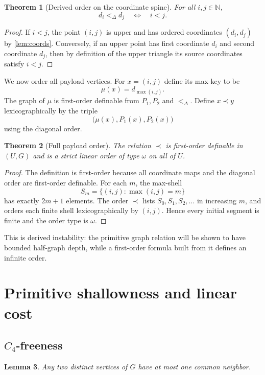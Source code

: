 \documentclass[11pt]{article}
\newtheorem{theorem}{Theorem}[section]
\newtheorem{lemma}[theorem]{Lemma}
\theoremstyle{definition}
\newcommand{\N}{\mathbb N}
\begin{document}
\begin{theorem}[Derived order on the coordinate spine]\label{thm:diagorder}
For all $i,j\in\N$,
\[
d_i<_{\Delta}d_j\quad\Longleftrightarrow\quad i<j.
\]
\end{theorem}

\begin{proof}
If $i<j$, the point $(i,j)$ is upper and has ordered coordinates $(d_i,d_j)$ by \cref{lem:coords}.  Conversely, if an upper point has first coordinate $d_i$ and second coordinate $d_j$, then by definition of the upper triangle its source coordinates satisfy $i<j$.
\end{proof}

We now order all payload vertices.  For $x=(i,j)$ define its max-key to be
\[
\mu(x)=d_{\max(i,j)}.
\]
The graph of $\mu$ is first-order definable from $P_1,P_2$ and $<_{\Delta}$.  Define $x\prec y$ lexicographically by the triple
\[
\bigl(\mu(x),P_1(x),P_2(x)\bigr)
\]
using the diagonal order.

\begin{theorem}[Full payload order]\label{thm:fullorder}
The relation $\prec$ is first-order definable in $(U,G)$ and is a strict linear order of type $\omega$ on all of $U$.
\end{theorem}

\begin{proof}
The definition is first-order because all coordinate maps and the diagonal order are first-order definable.  For each $m$, the max-shell
\[
S_m=\{(i,j):\max(i,j)=m\}
\]
has exactly $2m+1$ elements.  The order $\prec$ lists $S_0,S_1,S_2,\ldots$ in increasing $m$, and orders each finite shell lexicographically by $(i,j)$.  Hence every initial segment is finite and the order type is $\omega$.
\end{proof}

This is derived instability: the primitive graph relation will be shown to have bounded half-graph depth, while a first-order formula built from it defines an infinite order.

\section{Primitive shallowness and linear cost}

\subsection{$C_4$-freeness}

\begin{lemma}\label{lem:codegree}
Any two distinct vertices of $G$ have at most one common neighbor.
\end{lemma}
\end{document}
